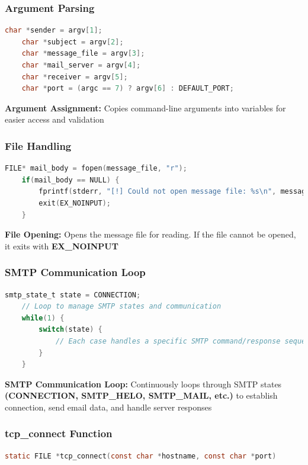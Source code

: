\documentclass[12pt,a4paper]{article}
\begin{document}
    \subsubsection{Argument Parsing}
    \begin{lstlisting}[language=C]
    char *sender = argv[1];
    char *subject = argv[2];
    char *message_file = argv[3];
    char *mail_server = argv[4];
    char *receiver = argv[5];
    char *port = (argc == 7) ? argv[6] : DEFAULT_PORT;
    \end{lstlisting}
    \textbf{Argument Assignment:} Copies command-line arguments into variables for easier access and validation

    \subsubsection{File Handling}
    \begin{lstlisting}[language=C]
    FILE* mail_body = fopen(message_file, "r");
    if(mail_body == NULL) {
        fprintf(stderr, "[!] Could not open message file: %s\n", message_file);
        exit(EX_NOINPUT);
    }
    \end{lstlisting}
    \textbf{File Opening:} Opens the message file for reading. If the file cannot be opened, it exits with \textbf{EX\_NOINPUT}

    \subsubsection{SMTP Communication Loop}
    \begin{lstlisting}[language=C]
    smtp_state_t state = CONNECTION;
    // Loop to manage SMTP states and communication
    while(1) {
        switch(state) {
            // Each case handles a specific SMTP command/response sequence
        }
    }
    \end{lstlisting}
    \textbf{SMTP Communication Loop:} Continuously loops through SMTP states \textbf{(CONNECTION, SMTP\_HELO, SMTP\_MAIL, etc.)} to establish connection, send email data, and handle server responses

    \subsubsection{tcp\_connect Function}
    \begin{lstlisting}[language=C]
    static FILE *tcp_connect(const char *hostname, const char *port)
    \end{lstlisting}
    
\end{document}

